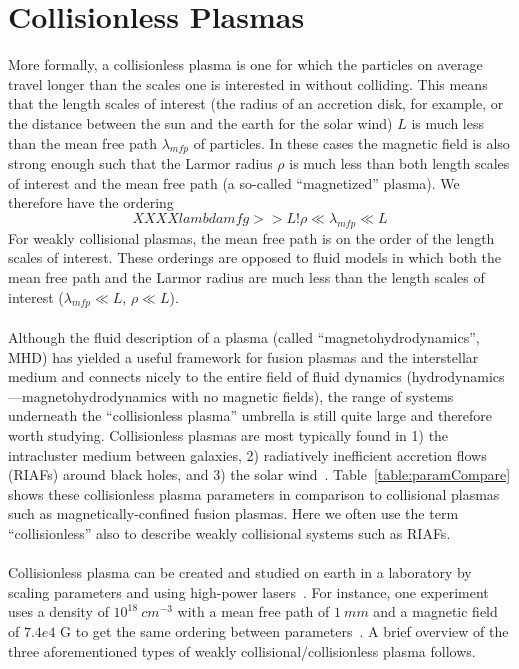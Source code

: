 \section{Collisionless Plasmas}
More formally, a collisionless plasma is one for which the particles on average travel longer than the scales one is interested in without colliding. This means that the length scales of interest (the radius of an accretion disk, for example, or the distance between the sun and the earth for the solar wind) $L$ is much less than the mean free path $\lambda_{mfp}$ of particles. In these cases the magnetic field is also strong enough such that the Larmor radius $\rho$ is much less than both length scales of interest and the mean free path (a so-called ``magnetized'' plasma). We therefore have the ordering
\begin{equation}\label{eq:collLessOrdering} XXXX lambdamfg >> L!
  \rho\ll\lambda_{mfp}\ll L
\end{equation}
For weakly collisional plasmas, the mean free path is on the order of the length scales of interest. These orderings are opposed to fluid models in which both the mean free path and the Larmor radius are much less than the length scales of interest ($\lambda_{mfp}\ll L$, $\rho\ll L$). \\
\\
Although the fluid description of a plasma (called ``magnetohydrodynamics'', MHD) has yielded a useful framework for fusion plasmas and the interstellar medium and connects nicely to the entire field of fluid dynamics (hydrodynamics---magnetohydrodynamics with no magnetic fields), the range of systems underneath the ``collisionless plasma'' umbrella is still quite large and therefore worth studying. Collisionless plasmas are most typically found in 1) the intracluster medium between galaxies, 2) radiatively inefficient accretion flows (RIAFs) around black holes, and 3) the solar wind~\cite{KunzFMI}. Table~\ref{table:paramCompare} shows these collisionless plasma parameters in comparison to collisional plasmas such as magnetically-confined fusion plasmas. Here we often use the term ``collisionless'' also to describe weakly collisional systems such as RIAFs. \\
\\
Collisionless plasma can be created and studied on earth in a laboratory by scaling parameters and using high-power lasers~\cite{Courtois2004,Romagnani2008,Dean1971}. For instance, one experiment uses a density of $10^{18}~cm^{-3}$ with a mean free path of $1~mm$ and a magnetic field of $7.4e4$ G to get the same ordering between parameters~\cite{Courtois2004}. A brief overview of the three aforementioned types of weakly collisional/collisionless plasma follows.\\
